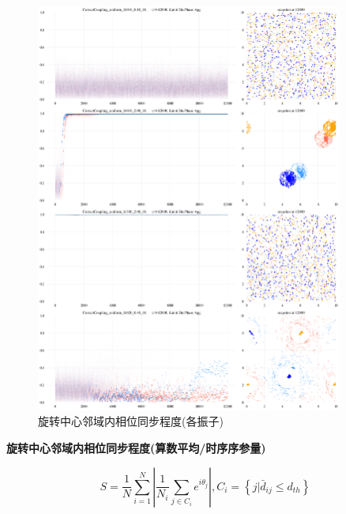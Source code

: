\documentclass{article}
\begin{document}
\begin{figure}[H]
	\centering
	\includegraphics[width=0.9\textwidth]{./figs/limitDisPhaseSync_ts.png}
	\caption{旋转中心邻域内相位同步程度(各振子)}
	\label{fig:fig234t.2}
\end{figure}

\newpage
\noindent\textbf{旋转中心邻域内相位同步程度(算数平均/时序序参量)}

$$
S=\frac{1}{N}\sum_{i=1}^N{\left| \frac{1}{N_i}\sum_{j\in C_i}{e^{i\theta _j}} \right|}, C_i=\left\{ j|\bar{d}_{ij}\le d_{th} \right\} 
$$
\end{document}
